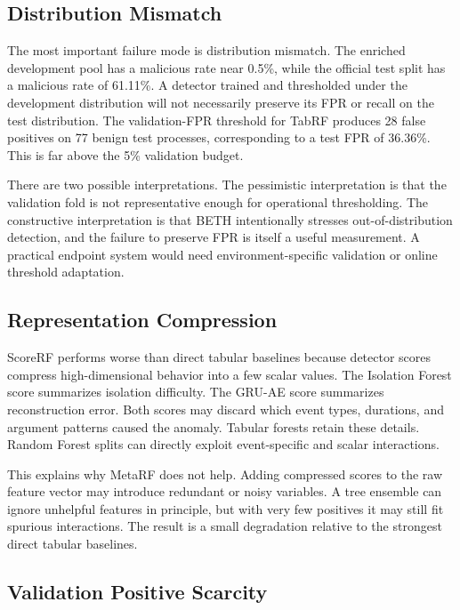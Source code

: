 \documentclass[10pt,journal,compsoc]{IEEEtran}
\begin{document}
\subsection{Distribution Mismatch}

The most important failure mode is distribution mismatch. The enriched development pool has a malicious rate near 0.5\%, while the official test split has a malicious rate of 61.11\%. A detector trained and thresholded under the development distribution will not necessarily preserve its FPR or recall on the test distribution. The validation-FPR threshold for TabRF produces 28 false positives on 77 benign test processes, corresponding to a test FPR of 36.36\%. This is far above the 5\% validation budget.

There are two possible interpretations. The pessimistic interpretation is that the validation fold is not representative enough for operational thresholding. The constructive interpretation is that BETH intentionally stresses out-of-distribution detection, and the failure to preserve FPR is itself a useful measurement. A practical endpoint system would need environment-specific validation or online threshold adaptation.

\subsection{Representation Compression}

ScoreRF performs worse than direct tabular baselines because detector scores compress high-dimensional behavior into a few scalar values. The Isolation Forest score summarizes isolation difficulty. The GRU-AE score summarizes reconstruction error. Both scores may discard which event types, durations, and argument patterns caused the anomaly. Tabular forests retain these details. Random Forest splits can directly exploit event-specific and scalar interactions.

This explains why MetaRF does not help. Adding compressed scores to the raw feature vector may introduce redundant or noisy variables. A tree ensemble can ignore unhelpful features in principle, but with very few positives it may still fit spurious interactions. The result is a small degradation relative to the strongest direct tabular baselines.

\subsection{Validation Positive Scarcity}
\end{document}
